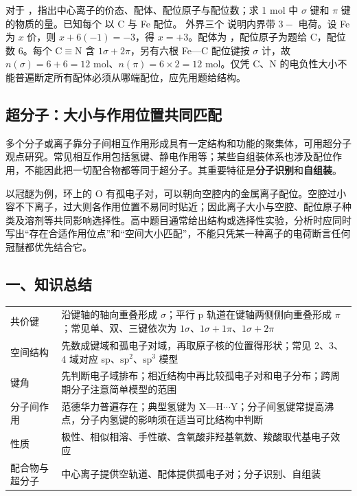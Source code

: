 \begin{liti}
对于 ，指出中心离子的价态、配体、配位原子与配位数；求 1 mol  中 $\sigma$ 键和 $\pi$ 键的物质的量。已知每个  以 C 与 Fe 配位。
\tcblower
\jie 外界三个  说明内界带 $3-$ 电荷。设 Fe 为 $x$ 价，则 $x+6(-1)=-3$，得 $x=+3$。配体为 ，配位原子为题给 C，配位数 6。每个 C$\equiv$N 含 $1\sigma+2\pi$，另有六根 Fe—C 配位键按 $\sigma$ 计，故 $n(\sigma)=6+6=12$ mol、$n(\pi)=6\times2=12$ mol。仅凭 C、N 的电负性大小不能普遍断定所有配体必须从哪端配位，应先用题给结构。
\end{liti}

\subsection{超分子：大小与作用位置共同匹配}
多个分子或离子靠分子间相互作用形成具有一定结构和功能的聚集体，可用超分子观点研究。常见相互作用包括氢键、静电作用等；某些自组装体系也涉及配位作用，不能因此把一切配合物都等同于超分子。其重要特征是\textbf{分子识别}和\textbf{自组装}。

以冠醚为例，环上的 O 有孤电子对，可以朝向空腔内的金属离子配位。空腔过小容不下离子，过大则各作用位置不易同时贴近；因此离子大小与空腔、配位原子种类及溶剂等共同影响选择性。高中题目通常给出结构或选择性实验，分析时应同时写出“存在合适作用位点”和“空间大小匹配”，不能只凭某一种离子的电荷断言任何冠醚都优先结合它。


\subsection*{一、知识总结}
\begin{center}
\small
\begin{tabularx}{\linewidth}{p{2.4cm}X}
\toprule
共价键 & 沿键轴的轴向重叠形成 $\sigma$；平行 p 轨道在键轴两侧侧向重叠形成 $\pi$；常见单、双、三键依次为 $1\sigma$、$1\sigma+1\pi$、$1\sigma+2\pi$ \\
空间结构 & 先数成键域和孤电子对域，再取原子核的位置得形状；常见 2、3、4 域对应 sp、$\mathrm{sp}^2$、$\mathrm{sp}^3$ 模型 \\
键角 & 先判断电子域排布；相近结构中再比较孤电子对和电子分布；跨周期分子注意简单模型的范围 \\
分子间作用 & 范德华力普遍存在；典型氢键为 X—H$\cdots$Y；分子间氢键常提高沸点，分子内氢键的影响须在适当可比结构中判断 \\
性质 & 极性、相似相溶、手性碳、含氧酸非羟基氧数、羧酸取代基电子效应 \\
配合物与超分子 & 中心离子提供空轨道、配体提供孤电子对；分子识别、自组装 \\
\bottomrule
\end{tabularx}
\end{center}
